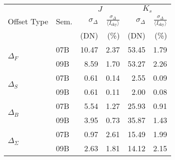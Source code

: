 \begin{tabular}{ll|rr|rr}
&  & \multicolumn{2}{c|}{$J$} & \multicolumn{2}{c}{$K_s$} \\ %
Offset Type & Sem. & $\sigma_\Delta$ & $\frac{\sigma_\Delta}{\langle I_\mathrm{sky}\rangle }$ & $\sigma_\Delta$ & $\frac{\sigma_\Delta}{\langle I_\mathrm{sky}\rangle }$ \\
& & \tiny{(DN)} &  \tiny{(\%)} & \tiny{(DN)} &  \tiny{(\%)} \\
\hline
\multirow{2}{*}{$\Delta_F$} & 07B & 10.47 & 2.37 & 53.45 & 1.79 \\
& 09B  & 8.59 & 1.70 & 53.27 & 2.26 \\
\hline
\multirow{2}{*}{$\Delta_S$} & 07B & 0.61 & 0.14 & 2.55 & 0.09 \\
& 09B & 0.61 & 0.11 & 2.00 & 0.08 \\
\hline
\multirow{2}{*}{$\Delta_B$} & 07B & 5.54 & 1.27 & 25.93 & 0.91 \\
& 09B &  3.95 & 0.73 & 35.87 & 1.43 \\
\hline
\multirow{2}{*}{$\Delta_\Sigma$} & 07B &  0.97 & 2.61 & 15.49 & 1.99 \\
& 09B &  2.63 & 1.81 & 14.12 & 2.15 \\
\end{tabular}